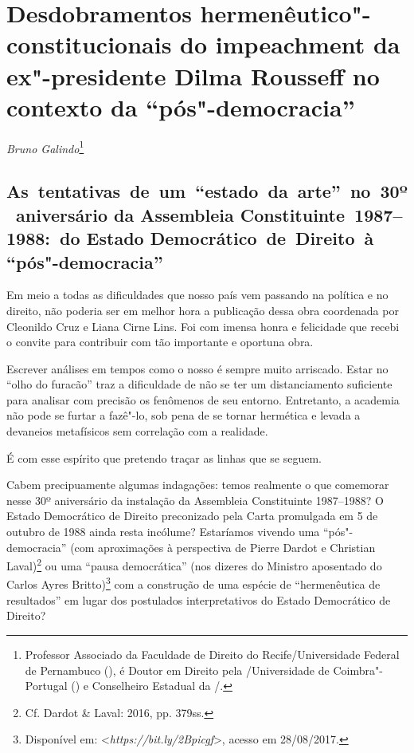 \chapter*{Desdobramentos hermenêutico"-constitucionais do
impeachment da ex"-presidente Dilma Rousseff no contexto da
``pós"-democracia''}


\begin{flushright}
\emph{Bruno Galindo}\footnote{Professor Associado da Faculdade de Direito do Recife/Universidade
Federal de Pernambuco (), é
Doutor em Direito pela /Universidade de Coimbra"-Portugal
() e Conselheiro Estadual da /.}
\end{flushright}


 \section{As~tentativas~de~um~``estado~da~arte''~no~30º~aniversário da Assembleia Constituinte~1987--1988:~do Estado Democrático~de~Direito~à ``pós"-democracia''}

Em meio a todas as dificuldades que nosso país vem passando na política
e no direito, não poderia ser em melhor hora a publicação dessa obra
coordenada por Cleonildo Cruz e Liana Cirne Lins. Foi com imensa honra e
felicidade que recebi o convite para contribuir com tão importante e
oportuna obra.

Escrever análises em tempos como o nosso é sempre muito arriscado. Estar
no ``olho do furacão'' traz a dificuldade de não se ter um
distanciamento suficiente para analisar com precisão os fenômenos de seu
entorno. Entretanto, a academia não pode se furtar a fazê"-lo, sob pena
de se tornar hermética e levada a devaneios metafísicos sem correlação
com a realidade.

É com esse espírito que pretendo traçar as linhas que se seguem.

Cabem precipuamente algumas indagações: temos realmente o que comemorar
nesse 30º aniversário da instalação da Assembleia Constituinte
1987--1988? O Estado Democrático de Direito preconizado pela Carta
promulgada em 5 de outubro de 1988 ainda resta incólume? Estaríamos
vivendo uma ``pós"-democracia'' (com aproximações à perspectiva de Pierre
Dardot e Christian Laval)\footnote{Cf. Dardot \& Laval: 2016, pp. 379ss.} ou
uma ``pausa democrática'' (nos dizeres do Ministro aposentado do 
Carlos Ayres Britto)\footnote{Disponível em: \textless{}\emph{https://bit.ly/2Bpicgf}\textgreater{},
  acesso em 28/08/2017.} com a construção de uma espécie de
``hermenêutica de resultados'' em lugar dos postulados interpretativos
do Estado Democrático de Direito?

